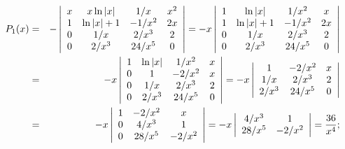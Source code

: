 \documentclass[dvips]{book}
\numberwithin{example}{section}
\numberwithin{equation}{section}
\numberwithin{theorem}{section}
\numberwithin{table}{section}
\numberwithin{figure}{section}
\begin{document}
\begin{eqnarray*}
P_1(x)&=&
-\left|\begin{array}{cccc}
x&x\ln|x|&1/x&x^2\\
1&\ln|x|+1&-1/x^2&2x\\
0&1/x&2/x^3&2\\
0&2/x^3&24/x^5&0
\end{array}\right|=
-x\left|\begin{array}{cccc}
1&\ln|x|&1/x^2&x\\
1&\ln|x|+1&-1/x^2&2x\\
0&1/x&2/x^3&2\\
0&2/x^3&24/x^5&0
\end{array}\right|\\
&=&-x\left|\begin{array}{cccc}
1&\ln|x|&1/x^2&x\\
0&1&-2/x^2&x\\
0&1/x&2/x^3&2\\
0&2/x^3&24/x^5&0
\end{array}\right|
=-x\left|\begin{array}{cccc}
1&-2/x^2&x\\
1/x&2/x^3&2\\
2/x^3&24/x^5&0
\end{array}\right|\\
&=&-x\left|\begin{array}{cccc}
1&-2/x^2&x\\
0&4/x^3&1\\
0&28/x^5&-2/x^2
\end{array}\right|
=-x\left|\begin{array}{cccc}
4/x^3&1\\
28/x^5&-2/x^2
\end{array}\right|={36\over x^4};
\end{eqnarray*}
\end{document}
